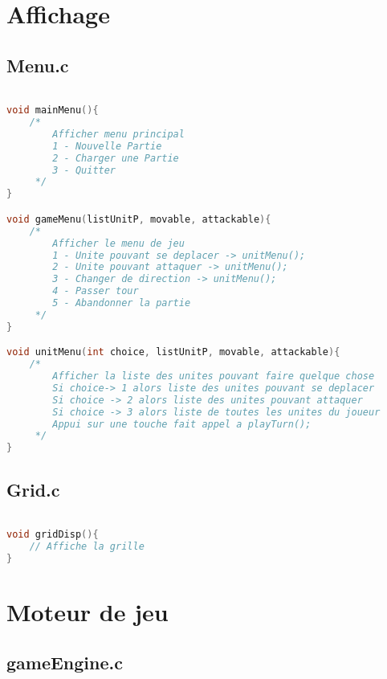 \documentclass[a4paper,10pt]{extreport}
\begin{document}
\part{Affichage}

\chapter{Menu.c}
\vspace{-1cm}

\begin{lstlisting}[language=c]

void mainMenu(){
	/*
		Afficher menu principal
		1 - Nouvelle Partie
		2 - Charger une Partie
		3 - Quitter
	 */
}

void gameMenu(listUnitP, movable, attackable){
	/*
		Afficher le menu de jeu
		1 - Unite pouvant se deplacer -> unitMenu();
		2 - Unite pouvant attaquer -> unitMenu();
		3 - Changer de direction -> unitMenu();
		4 - Passer tour
		5 - Abandonner la partie
	 */
}

void unitMenu(int choice, listUnitP, movable, attackable){
	/*
		Afficher la liste des unites pouvant faire quelque chose
		Si choice-> 1 alors liste des unites pouvant se deplacer
		Si choice -> 2 alors liste des unites pouvant attaquer
		Si choice -> 3 alors liste de toutes les unites du joueur
		Appui sur une touche fait appel a playTurn();
	 */
}
\end{lstlisting}

\chapter{Grid.c}
\vspace{-1cm}

\begin{lstlisting}[language=c]

void gridDisp(){
	// Affiche la grille
}

\end{lstlisting}

\part{Moteur de jeu}

\chapter{gameEngine.c}
\vspace{-1cm}
\end{document}
